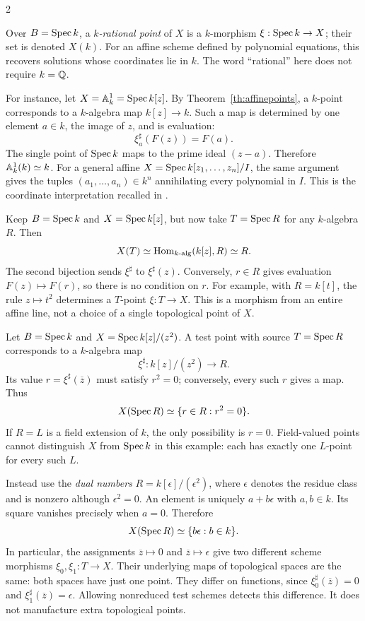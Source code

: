 \documentclass[12pt]{memoir}
\begin{document}
\begin{multicols}{2}
\begin{Ex}\label{ex:rationalpoints}
Over $B=\operatorname{Spec} k$, a \emph{$k$-rational point} of $X$ is a
$k$-morphism $\xi:\operatorname{Spec} k\to X$; their set is denoted $X(k)$.
For an affine scheme defined by polynomial equations, this recovers
solutions whose coordinates lie in $k$. The word ``rational'' here
does not require $k=\mathbb{Q}$.

For instance, let $X=\mathbb{A}^1_k=\operatorname{Spec} k[z]$. By
Theorem~\ref{th:affinepoints}, a $k$-point corresponds to a
$k$-algebra map $k[z]\to k$. Such a map is determined by one
element $a\in k$, the image of $z$, and is evaluation:
\[
 \xi_a^\sharp(F(z))=F(a).
\]
The single point of $\operatorname{Spec} k$ maps to the prime ideal $(z-a)$.
Therefore $\mathbb{A}^1_k(k)\simeq k$. For a general affine
$X=\operatorname{Spec} k[z_1,\ldots,z_n]/I$, the same argument gives the tuples
$(a_1,\ldots,a_n)\in k^n$ annihilating every polynomial in $I$.
This is the coordinate interpretation recalled in
\cite[Section~2.3.1]{Poonen}.
\end{Ex}

\begin{Ex}
Keep $B=\operatorname{Spec} k$ and $X=\operatorname{Spec} k[z]$, but now take
$T=\operatorname{Spec} R$ for any $k$-algebra $R$. Then
\[
 X(T)\simeq\operatorname{Hom}_{k\text{-alg}}(k[z],R)\simeq R.
\]
The second bijection sends $\xi^\sharp$ to $\xi^\sharp(z)$.
Conversely, $r\in R$ gives evaluation $F(z)\mapsto F(r)$, so
there is no condition on $r$. For example, with $R=k[t]$, the rule
$z\mapsto t^2$ determines a $T$-point $\xi:T\to X$.
This is a morphism from an entire affine line, not a choice of a
single topological point of $X$.
\end{Ex}

\begin{Ex}\label{ex:dualpoints}
Let $B=\operatorname{Spec} k$ and
$X=\operatorname{Spec} k[z]/(z^2)$. A test point with source $T=\operatorname{Spec} R$
corresponds to a $k$-algebra map
\[
 \xi^\sharp:k[z]/(z^2)\longrightarrow R.
\]
Its value $r=\xi^\sharp(\overline z)$ must satisfy $r^2=0$;
conversely, every such $r$ gives a map. Thus
\[
 X(\operatorname{Spec} R)\simeq\{r\in R:r^2=0\}.
\]
If $R=L$ is a field extension of $k$, the only possibility is $r=0$.
Field-valued points cannot distinguish $X$ from $\operatorname{Spec} k$ in this
example: each has exactly one $L$-point for every such $L$.

Instead use the \emph{dual numbers}
$R=k[\epsilon]/(\epsilon^2)$, where $\epsilon$ denotes the residue
class and is nonzero although $\epsilon^2=0$. An element is uniquely
$a+b\epsilon$ with $a,b\in k$. Its square vanishes precisely when
$a=0$. Therefore
\[
 X(\operatorname{Spec} R)\simeq\{b\epsilon:b\in k\}.
\]
In particular, the assignments $\overline z\mapsto0$ and
$\overline z\mapsto\epsilon$ give two different scheme morphisms
$\xi_0,\xi_1:T\to X$. Their underlying maps of topological spaces
are the same: both spaces have just one point. They differ on
functions, since $\xi_0^\sharp(\overline z)=0$ and
$\xi_1^\sharp(\overline z)=\epsilon$. Allowing nonreduced test
schemes detects this difference. It does not manufacture extra
topological points.
\end{Ex}


\end{multicols}
\end{document}
